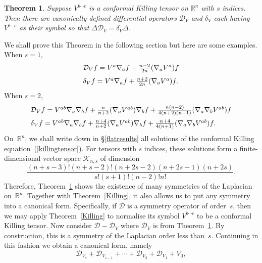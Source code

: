 \documentclass[a4paper,12pt]{amsart}
\newtheorem{thm}{Theorem}
\begin{document}
\begin{thm}\label{existence}
Suppose $V^{b\cdots c}$ is a conformal Killing tensor on ${\mathbb R}^n$ with
$s$ indices. Then there are canonically defined differential operators
${\mathcal D}_V$ and $\delta_V$ each having $V^{b\cdots c}$ as their symbol so
that $\Delta{\mathcal D}_V=\delta_V\Delta$.
\end{thm}
\noindent We shall prove this Theorem in the following section but here are
some examples. When $s=1$,
\begin{equation}\label{examplewhensisone}\begin{array}l
{\mathcal D}_Vf=V^a\nabla_af+\frac{n-2}{2n}(\nabla_aV^a)f\\[7pt]
\delta_Vf=V^a\nabla_af+\frac{n+2}{2n}(\nabla_aV^a)f.\end{array}
\end{equation}
When $s=2$,
\begin{equation}\label{examplewhensistwo}\begin{array}l{\mathcal D}_Vf=
V^{ab}\nabla_a\nabla_bf+\frac{n}{n+2}(\nabla_aV^{ab})\nabla_bf+
\frac{n(n-2)}{4(n+2)(n+1)}(\nabla_a\nabla_bV^{ab})f\\[7pt]
\delta_Vf=V^{ab}\nabla_a\nabla_bf+\frac{n+4}{n+2}(\nabla_aV^{ab})\nabla_bf+
\frac{n+4}{4(n+1)}(\nabla_a\nabla_bV^{ab})f.\end{array}\end{equation}
On~${\mathbb R}^n$, we shall write down in \S\ref{flatresults} all solutions of
the conformal Killing equation~(\ref{killingtensor}). For tensors with $s$
indices, these solutions form a finite-dimensional vector space
${\mathcal K}_{n,s}$ of dimension
\begin{equation}\label{dimension}
\frac{(n+s-3)!(n+s-2)!(n+2s-2)(n+2s-1)(n+2s)}{s!(s+1)!(n-2)!n!}.\end{equation}
Therefore, Theorem~\ref{existence} shows the existence of many symmetries of
the Laplacian on~${\mathbb R}^n$. Together with Theorem~\ref{Killing}, it also
allows us to put any symmetry into a canonical form. Specifically, if
${\mathcal D}$ is a symmetry operator of order~$s$, then we may
apply Theorem~\ref{Killing} to normalise its symbol $V^{b\cdots c}$ to be a
conformal Killing tensor. Now consider ${\mathcal D}-{\mathcal D}_V$ where
${\mathcal D}_V$ is from Theorem~\ref{existence}. By construction, this is a
symmetry of the Laplacian order less than~$s$. Continuing in this fashion we
obtain a canonical form, namely
$${\mathcal D}_{V_s}+{\mathcal D}_{V_{s-1}}+\cdots+{\mathcal D}_{V_2}
+{\mathcal D}_{V_1}+V_0,$$
\end{document}
